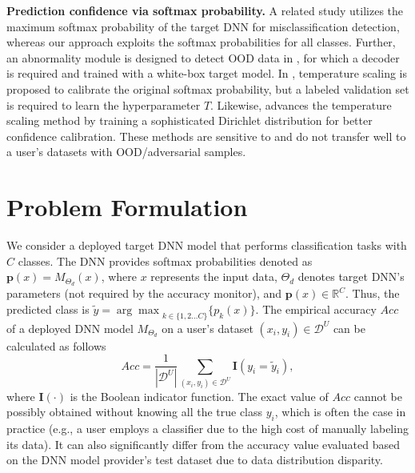 \documentclass{article}
\begin{document}
\textbf{Prediction confidence via softmax probability.}
A related study
\cite{DNN_Uncertainty_Baseline_OOD_ICLR_2017}
utilizes the maximum softmax probability of the target DNN for misclassification detection, whereas our approach exploits  the softmax probabilities for all classes.
Further, an abnormality module is designed to detect OOD data in \cite{DNN_Uncertainty_Baseline_OOD_ICLR_2017},
for which a decoder is required and trained with a white-box target model.
In \cite{DNN_Calibration_TemperatureScaling_ICML_2017_calibration_guo_2017}, {temperature scaling} is proposed to calibrate the original softmax probability,
but a labeled validation set is required to learn the hyperparameter $T$.
Likewise, \cite{DNN_Uncertainty_PostHoc_Dirichlet_NIPS_2019_kull2019beyond}
advances the temperature scaling method by training
a sophisticated Dirichlet distribution for better confidence calibration.
These methods are sensitive to and do not transfer
well to a user's datasets with OOD/adversarial samples. \section{Problem Formulation}
We consider a deployed target DNN model that performs classification tasks
with $C$ classes. The DNN provides softmax probabilities
denoted as ${\mathbf{p}(x)}=M_{\Theta_d}(x)$, where $x$ represents the input data, ${\Theta}_d$ denotes target DNN's parameters  (not required by the accuracy monitor),  and $\mathbf{p}(x)\in \mathbb{R}^C$. Thus, the
predicted class is  $\tilde{y}={\arg \max}_{k\in\{1,2...C\}}\{p_k(x)\}$. 
The empirical accuracy $Acc$ of a deployed DNN model $M_{\Theta_d}$ on a user's dataset $(x_i,y_i)\in\mathcal{D}^U$ can be calculated as follows \begin{equation}\label{eqn:true_accuracy}
Acc = \frac{1}{|\mathcal{D}^U|}\sum_{(x_i,y_i)\in\mathcal{D}^U}\mathbf{I}\left(y_i=\tilde{y}_i\right),
\end{equation}
where $\mathbf{I}(\cdot)$ is the Boolean indicator function.
The exact value of $Acc$ cannot be possibly obtained without
knowing all the true class $y_i$, which is often the case in practice
(e.g., a user employs a classifier due to the high cost of manually
labeling its data). It can also significantly
differ from the accuracy value evaluated based on
the DNN model provider's test dataset due to data
distribution disparity.
\end{document}
